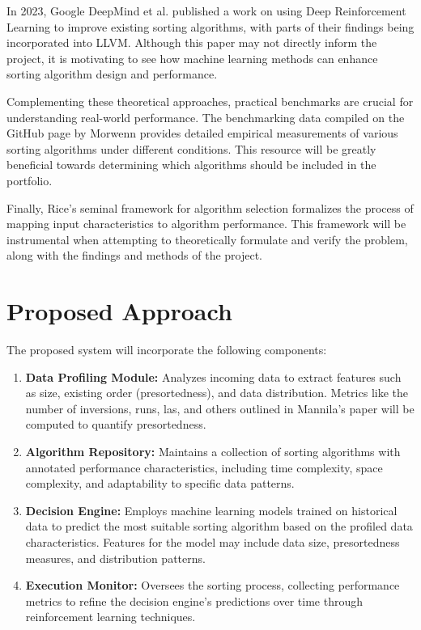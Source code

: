 \documentclass{article}
\begin{document}
In 2023, Google DeepMind et al. \cite{alphadev} published a work on using Deep Reinforcement Learning to improve existing sorting algorithms, with parts of their findings being incorporated into LLVM. Although this paper may not directly inform the project, it is motivating to see how machine learning methods can enhance sorting algorithm design and performance.

Complementing these theoretical approaches, practical benchmarks are crucial for understanding real-world performance. The benchmarking data compiled on the GitHub page by Morwenn \cite{cppsort_benchmarks} provides detailed empirical measurements of various sorting algorithms under different conditions. This resource will be greatly beneficial towards determining which algorithms should be included in the portfolio.

Finally, Rice’s seminal framework for algorithm selection \cite{ricealgorithmselection} formalizes the process of mapping input characteristics to algorithm performance. This framework will be instrumental when attempting to theoretically formulate and verify the problem, along with the findings and methods of the project.

\section{Proposed Approach}
The proposed system will incorporate the following components:
\begin{enumerate}
    \item \textbf{Data Profiling Module:} Analyzes incoming data to extract features such as size, existing order (presortedness), and data distribution. Metrics like the number of inversions, runs, las, and others outlined in Mannila's \cite{Mannila1985MeasuresOP} paper will be computed to quantify presortedness.
    \item \textbf{Algorithm Repository:} Maintains a collection of sorting algorithms with annotated performance characteristics, including time complexity, space complexity, and adaptability to specific data patterns.
    \item \textbf{Decision Engine:} Employs machine learning models trained on historical data to predict the most suitable sorting algorithm based on the profiled data characteristics. Features for the model may include data size, presortedness measures, and distribution patterns.
    \item \textbf{Execution Monitor:} Oversees the sorting process, collecting performance metrics to refine the decision engine's predictions over time through reinforcement learning techniques.
\end{enumerate}
\end{document}
